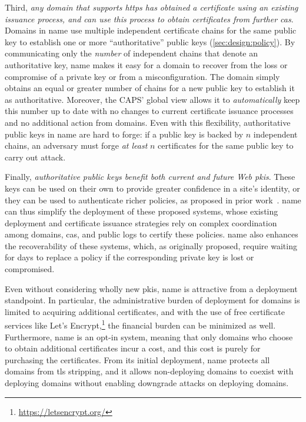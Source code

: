 Third, \emph{any domain that supports \ac{https} has obtained a certificate
using an existing issuance process, and can use this process to obtain
certificates from further \acp{ca}}. Domains in \ac{name} use multiple
independent certificate chains for the same public key to establish one or more
``authoritative'' public keys (\autoref{sec:design:policy}). By communicating
only the \emph{number} of independent chains that denote an authoritative key,
\ac{name} makes it easy for a domain to recover from the loss or compromise of a
private key or from a misconfiguration. The domain simply obtains an equal or
greater number of chains for a new public key to establish it as authoritative.
Moreover, the CAPS' global view allows it to
\emph{automatically} keep this number up to date with no changes to current
certificate issuance processes and no additional action from domains. Even with
this flexibility, authoritative public keys in \ac{name} are hard to forge: if a
public key is backed by $n$ independent chains, an adversary must forge \emph{at
least} $n$ certificates for the same public key to carry out  attack.

Finally, \emph{authoritative public keys benefit both current and future Web
\acp{pki}}. These keys can be used on their own to provide greater confidence in
a site's identity, or they can be used to authenticate richer policies, as
proposed in prior work~\cite{basin2014arpki, szalachowski2014policert}.
\ac{name} can thus simplify the deployment of these proposed systems, whose
existing deployment and certificate issuance strategies rely on complex
coordination among domains, \acp{ca}, and public logs to certify these policies.
\ac{name} also enhances the recoverability of these systems, which, as
originally proposed, require waiting for days to replace a policy if the
corresponding private key is lost or compromised.

Even without considering wholly new \acp{pki}, \ac{name} is attractive from a
deployment standpoint. In particular, the administrative burden of deployment
for domains is limited to acquiring additional certificates, and with the use of
free certificate services like Let's
Encrypt,\footnote{\url{https://letsencrypt.org/}} the financial burden can be
minimized as well. Furthermore, \ac{name} is an opt-in system, meaning that only
domains who choose to obtain additional certificates incur a cost, and this cost
is purely for purchasing the certificates. From its initial deployment,
\ac{name} protects all domains from \ac{tls} stripping, and it allows
non-deploying domains to coexist with deploying domains without enabling
downgrade attacks on deploying domains.

